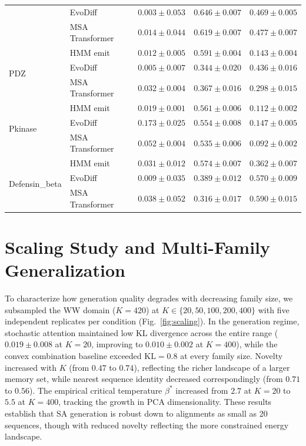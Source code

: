 \begin{table}[ht]
\begin{tabular}{@{}llccc@{}}
 & EvoDiff         & $0.003 \pm 0.053$ & $0.646 \pm 0.007$ & $0.469 \pm 0.005$ \\
 & MSA Transformer & $0.014 \pm 0.044$ & $0.619 \pm 0.007$ & $0.477 \pm 0.007$ \\
\midrule
\multirow{3}{*}{PDZ}
 & HMM emit        & $0.012 \pm 0.005$ & $0.591 \pm 0.004$ & $0.143 \pm 0.004$ \\
 & EvoDiff         & $0.005 \pm 0.007$ & $0.344 \pm 0.020$ & $0.436 \pm 0.016$ \\
 & MSA Transformer & $0.032 \pm 0.004$ & $0.367 \pm 0.016$ & $0.298 \pm 0.015$ \\
\midrule
\multirow{3}{*}{Pkinase}
 & HMM emit        & $0.019 \pm 0.001$ & $0.561 \pm 0.006$ & $0.112 \pm 0.002$ \\
 & EvoDiff         & $0.173 \pm 0.025$ & $0.554 \pm 0.008$ & $0.147 \pm 0.005$ \\
 & MSA Transformer & $0.052 \pm 0.004$ & $0.535 \pm 0.006$ & $0.092 \pm 0.002$ \\
\midrule
\multirow{3}{*}{Defensin\_beta}
 & HMM emit        & $0.031 \pm 0.012$ & $0.574 \pm 0.007$ & $0.362 \pm 0.007$ \\
 & EvoDiff         & $0.009 \pm 0.035$ & $0.389 \pm 0.012$ & $0.570 \pm 0.009$ \\
 & MSA Transformer & $0.038 \pm 0.052$ & $0.316 \pm 0.017$ & $0.590 \pm 0.015$ \\
\bottomrule
\end{tabular}
\end{table}

\section{Scaling Study and Multi-Family Generalization}\label{si:scaling}

To characterize how generation quality degrades with decreasing family size, we subsampled the WW domain ($K{=}420$) at $K \in \{20, 50, 100, 200, 400\}$ with five independent replicates per condition (Fig.~\ref{fig:scaling}). In the generation regime, stochastic attention maintained low KL divergence across the entire range ($0.019 \pm 0.008$ at $K{=}20$, improving to $0.010 \pm 0.002$ at $K{=}400$), while the convex combination baseline exceeded $\mathrm{KL}{=}0.8$ at every family size. Novelty increased with $K$ (from $0.47$ to $0.74$), reflecting the richer landscape of a larger memory set, while nearest sequence identity decreased correspondingly (from $0.71$ to $0.56$). The empirical critical temperature $\beta^*$ increased from $2.7$ at $K{=}20$ to $5.5$ at $K{=}400$, tracking the growth in PCA dimensionality. These results establish that SA generation is robust down to alignments as small as 20 sequences, though with reduced novelty reflecting the more constrained energy landscape.

